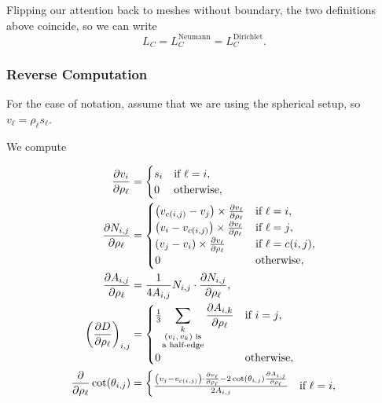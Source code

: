 Flipping our attention back to meshes without boundary, the two definitions above coincide, so we can write \[L_C = L_C^{\text{Neumann}} = L_C^{\text{Dirichlet}}.\]

\subsubsection{Reverse Computation}

For the ease of notation, assume that we are using the spherical setup, so \(v_\ell = \rho_\ell s_\ell\).

We compute

\begin{align*}
	\frac{\partial v_i}{\partial \rho_\ell} &= \begin{cases}
		s_i & \text{if \(\ell = i\)}, \\
		0 & \text{otherwise},
	\end{cases} \\
	\frac{\partial N_{i, j}}{\partial \rho_\ell} &= \begin{cases}
		\pof{v_{c\pof{i, j}} - v_j} \times \frac{\partial v_\ell}{\partial \rho_\ell} & \text{if \(\ell = i\)}, \\
		\pof{v_i - v_{c\pof{i, j}}} \times \frac{\partial v_\ell}{\partial \rho_\ell} & \text{if \(\ell = j\)}, \\
		\pof{v_j - v_i} \times \frac{\partial v_\ell}{\partial \rho_\ell} & \text{if \(\ell = c\pof{i, j}\)}, \\
		0 & \text{otherwise},
	\end{cases} \\
	\frac{\partial A_{i, j}}{\partial \rho_\ell} &= \frac{1}{4A_{i, j}}N_{i, j} \cdot \frac{\partial N_{i, j}}{\partial \rho_\ell}, \\
	\pof{\frac{\partial D}{\partial \rho_\ell}}_{i, j} &= \begin{cases}
		\frac{1}{3}{\displaystyle\sum_{\substack{k \\ \text{\(\pof{v_i, v_k}\) is} \\ \text{a half-edge}}}\frac{\partial A_{i, k}}{\partial \rho_\ell}} & \text{if \(i = j\)}, \\
		0 & \text{otherwise},
	\end{cases} \\
	\frac{\partial}{\partial \rho_\ell}\cot\pof{\theta_{i, j}} &= \begin{cases}
		\frac{\pof{v_j - v_{c\pof{i, j}}} \cdot \frac{\partial v_\ell}{\partial \rho_\ell} - 2\cot\pof{\theta_{i, j}}\frac{\partial A_{i, j}}{\partial \rho_\ell}}{2A_{i, j}} & \text{if \(\ell = i\)}, \\

\end{cases}
\end{align*}
